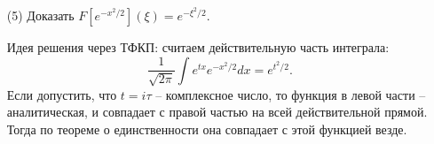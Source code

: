 \begin{itemize}
    \item[(5)] Доказать $F[e^{-x^2/2}](\xi) = e^{-\xi^2 / 2}$. 
    
    Идея решения через ТФКП: считаем действительную часть интеграла: 
    \begin{equation*}
        \frac{1}{\sqrt{2\pi}}\int e^{tx}e^{-x^2 / 2}dx = e^{t^2 / 2}.
    \end{equation*}
    Если допустить, что $t = i\tau$ -- комплексное число, то функция в левой части -- аналитическая, и совпадает с правой частью на всей действительной прямой. Тогда по теореме о единственности она совпадает с этой функцией везде.
\end{itemize}



































































